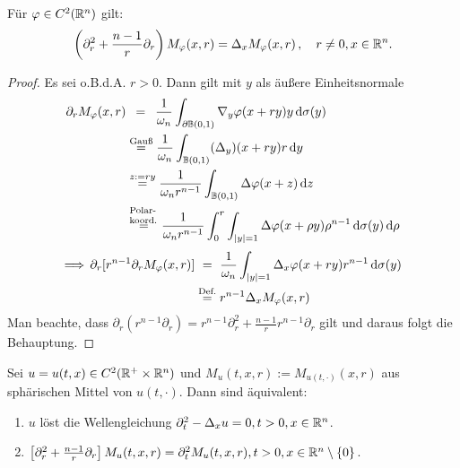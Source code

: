\begin{satz}
\label{satz:9.4}
Für $\varphi \in C^2(\mathbb{R}^n)$ gilt:
\[
	\left(\partial_r^2 + \frac{n-1}r \partial_r\right) M_\varphi (x,r) = \Delta_x M_\varphi (x,r) \, , \quad r \neq 0 , x \in \mathbb{R}^n .
\]
\end{satz}

\begin{proof}
Es sei o.B.d.A. $r > 0$. Dann gilt mit $y$ als äußere Einheitsnormale
\begin{align*}
	\partial_r M_\varphi(x,r)& \ \, =\ \, \frac 1{\omega_n} \int_{\partial \B(0,1)} \nabla_y \varphi (x+ry) y \d \sigma(y) \\
	& \stackrel{\scriptsize\text{Gauß}}= \frac 1{\omega_n} \int_{\B(0,1)} (\Delta_y)(x+ry) r \d y \\
	& \stackrel{z:=ry}= \frac 1{\omega_n r^{n-1}} \int_{\B(0,1)} \Delta \varphi(x+z) \d z \\
	& \stackrel{\scriptsize\parbox{0.8cm}{Polar-\\koord.}}= \frac 1{\omega_n r^{n-1}} \int_0^r\int_{\abs y = 1} \Delta \varphi (x+\rho y) \rho^{n-1} \d \sigma(y) \d \rho \\
\end{align*}
\begin{align*}
	\Longrightarrow \, \partial_r [r^{n-1} \partial_r M_\varphi(x,r)] &\  =\, \, \frac 1{\omega_n} \int_{\lvert y\rvert = 1} \Delta_x \varphi (x+ry) r^{n-1} \,\mathrm{d} \sigma(y) \\
	& \stackrel{\scriptsize\text{Def.}}= r^{n-1} \Delta_x M_\varphi (x,r) 
\end{align*}
Man beachte, dass $\partial_r(r^{n-1} \partial_r) = r^{n-1} \partial_r^2 + \frac{n-1}r r^{n-1} \partial_r$ gilt und daraus folgt die Behauptung.
\end{proof}

\begin{kor}
\label{kor:9.5}
Sei $u = u(t,x)\in C^2 (\mathbb{R}^+ \times \mathbb{R}^n)$ und $M_u (t,x,r):=M_{u(t,\cdot)} (x,r)$ aus sphärischen Mittel von $u(t,\cdot)$. Dann sind äquivalent:
\begin{enumerate}[\rm(i)]
\item $u$ löst die Wellengleichung $\partial_t^2 - \Delta_x u = 0, t > 0, x \in \mathbb{R}^n$.
\item $ \left[ \partial_r^2 + \frac{n-1}r \partial_r\right] M_u(t,x,r) = \partial_t^2 M_u(t,x,r) , t > 0, x \in \mathbb{R}^n \setminus\{0\}$.
\end{enumerate}
\end{kor}

